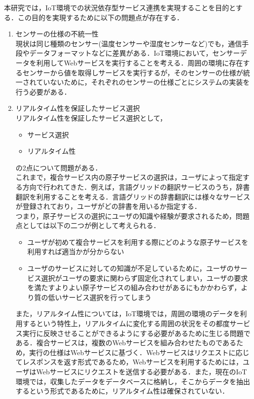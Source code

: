 \documentclass{kuisthesis}			%
\begin{document}
本研究では，IoT環境での状況依存型サービス連携を実現することを目的とする．この目的を実現するために以下の問題点が存在する．
\begin{enumerate}
\item センサーの仕様の不統一性\\
現状は同じ種類のセンサー(温度センサーや湿度センサーなど)でも，通信手段やデータフォーマットなどに差異がある．IoT環境において，センサーデータを利用してWebサービスを実行することを考える．周囲の環境に存在するセンサーから値を取得しサービスを実行するが，そのセンサーの仕様が統一されていないために，それぞれのセンサーの仕様ごとにシステムの実装を行う必要がある．
\item リアルタイム性を保証したサービス選択\\
リアルタイム性を保証したサービス選択として，
\begin{itemize}
\item サービス選択
\item リアルタイム性
\end{itemize}
の2点について問題がある．\\
これまで，複合サービス内の原子サービスの選択は，ユーザによって指定する方向で行われてきた．例えば，言語グリッドの翻訳サービスのうち，辞書翻訳を利用することを考える．言語グリッドの辞書翻訳には様々なサービスが登録されており，ユーザがどの辞書を用いるか指定する．\\
つまり，原子サービスの選択にユーザの知識や経験が要求されるため，問題点としては以下の二つが例として考えられる．
\begin{itemize}
\item ユーザが初めて複合サービスを利用する際にどのような原子サービスを利用すれば適当かが分からない
\item ユーザのサービスに対しての知識が不足しているために，ユーザのサービス選択がユーザの要求に関わらず固定化されてしまい，ユーザの要求を満たすよりよい原子サービスの組み合わせがあるにもかかわらず，より質の低いサービス選択を行ってしまう
\end{itemize}
また，リアルタイム性については，IoT環境では，周囲の環境のデータを利用するという特性上，リアルタイムに変化する周囲の状況をその都度サービス実行に反映させることができるようにする必要があるために生じる問題である．複合サービスは，複数のWebサービスを組み合わせたものであるため，実行の仕様はWebサービスに基づく．Webサービスはリクエストに応じてレスポンスを返す形式であるため，Webサービスを利用するためには，ユーザはWebサービスにリクエストを送信する必要がある．また，現在のIoT環境では，収集したデータをデータベースに格納し，そこからデータを抽出するという形式であるために，リアルタイム性は確保されていない．
\end{enumerate}
\end{document}
